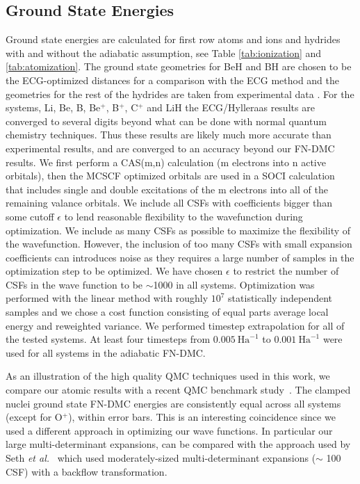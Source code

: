 \documentclass[pra,superscriptaddress,groupedaddress,twocolumn]{revtex4}
\begin{document}
\subsection{Ground State Energies}
Ground state energies are calculated for first row atoms and ions and hydrides with and without the adiabatic assumption, see Table \ref{tab:ionization} and \ref{tab:atomization}. The ground state geometries for BeH and BH are chosen to be the ECG-optimized distances for a comparison with the ECG method and the geometries for the rest of the hydrides are taken from experimental data \cite{CCCBDB}. For the systems, Li, Be, B, Be$^+$, B$^+$, C$^+$ and LiH the ECG/Hylleraas results are converged to several digits beyond what can be done with normal quantum chemistry techniques.  Thus these results are likely much more accurate than experimental results, and are converged to an accuracy beyond our FN-DMC results.   %
   We first perform a CAS(m,n) calculation (m electrons into n active orbitals), then the MCSCF optimized orbitals are used in a SOCI calculation that includes single and double excitations of the m electrons into all of the remaining valance orbitals. We include all CSFs with coefficients bigger than some cutoff $\epsilon$ to lend reasonable flexibility to the wavefunction during optimization. We include as many CSFs as possible to maximize the flexibility of the wavefunction. However, the inclusion of too many CSFs with small expansion coefficients can introduces noise as they requires a large number of samples in the optimization step to be optimized. We have chosen $\epsilon$ to restrict the number of CSFs in the wave function to be $\sim$1000 in all systems. Optimization was performed with the linear method with roughly $10^7$ statistically independent samples and we chose a cost function consisting of equal parts average local energy and reweighted variance. We performed timestep extrapolation for all of the tested systems. At least four timesteps from $0.005~\text{Ha}^{-1}$ to $0.001~\text{Ha}^{-1}$ were used for all systems in the adiabatic FN-DMC.

As an illustration of the high quality QMC techniques used in this work, we compare our atomic results with a recent QMC benchmark study~\cite{Seth_Bench}. The clamped nuclei ground state FN-DMC energies are consistently equal across all systems (except for O$^{+}$), within error bars. This is an interesting coincidence since we used a different approach in optimizing our wave functions. In particular our large multi-determinant expansions, can be compared with the approach used by Seth {\it et al.}~\cite{Seth_Bench} which used moderately-sized multi-determinant expansions ($\sim$ 100 CSF) with a backflow transformation.   
 
\end{document}
